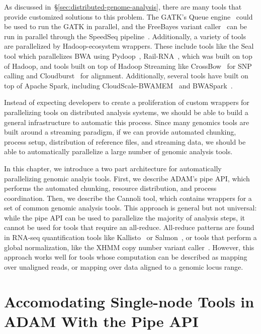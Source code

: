 \documentclass[phd]{ucbthesis}
\begin{document}
As discussed in~\S\ref{sec:distributed-genome-analysis}, there are many tools
that provide customized solutions to this problem. The GATK's {Queue}
engine~\cite{depristo11} could be used to run the GATK in parallel, and the
{FreeBayes} variant caller~\cite{garrison12} can be run in parallel
through the {SpeedSeq} pipeline~\cite{chiang15}. Additionally, a variety
of tools are parallelized by {Hadoop}-ecosystem wrappers. These include
tools like the {Seal} tool which parallelizes {BWA} using
{Pydoop}~\cite{leo10, pireddu11}, {Rail-RNA}~\cite{nellore16},
which was built on top of {Hadoop}, and tools built on top of
{Hadoop Streaming} like {CrossBow}~\cite{langmead09crossbow} for
SNP calling and {Cloudburst}~\cite{schatz09} for alignment.
Additionally, several tools have built on top of {Apache Spark},
including {CloudScale-BWAMEM}~\cite{chen16} and
{BWASpark}~\cite{abuin16}.

Instead of expecting developers to create a proliferation of custom wrappers for
parallelizing tools on distributed analysis systems, we should be able to build
a general infrastructure to automatic this process. Since many genomics tools
are built around a streaming paradigm, if we can provide automated chunking,
process setup, distribution of reference files, and streaming data, we should
be able to automatically parallelize a large number of genomic analysis tools.

In this chapter, we introduce a two part architecture for automatically
parallelizing genomic analyis tools. First, we describe ADAM's {pipe}
API, which performs the automated chunking, resource distribution, and process
coordination. Then, we describe the {Cannoli} tool, which contains
wrappers for a set of common genomic analysis tools. This approach is general
but not universal: while the {pipe} API can be used to parallelize the
majority of analysis steps, it cannot be used for tools that require an
all-reduce. All-reduce patterns are found in RNA-seq quantification tools like
{Kallisto}~\cite{bray16} or {Salmon}~\cite{patro17}, or tools
that perform a global normalization, like the XHMM copy number variant
caller~\cite{fromer12}. However, this approach works well for tools whose
computation can be described as mapping over unaligned reads, or mapping over
data aligned to a genomic locus range.

\section{Accomodating Single-node Tools in {ADAM} With the {Pipe} API}
\label{sec:pipe-api}
\end{document}
